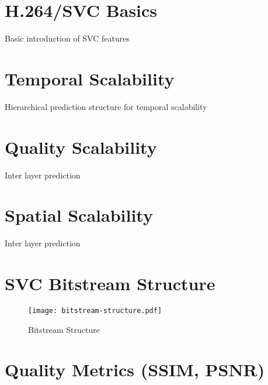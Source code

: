 
\section{H.264/SVC Basics}
Basic introduction of SVC features

\section{Temporal Scalability}
Hierarchical prediction structure for temporal scalability

\section{Quality Scalability}
Inter layer prediction

\section{Spatial Scalability}
Inter layer prediction

\section{SVC Bitstream Structure}
\label{sec:svc_bitstream_structure}
    \begin{figure}[H]
        \centering
        \texttt{[image: bitstream-structure.pdf]}
        \caption{Bitstream Structure}
        \label{fig:svc_bitstream_structure}
    \end{figure}

\section{Quality Metrics (SSIM, PSNR)}
